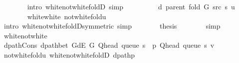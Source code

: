 \begin{isabellebody}
\ \ \ \ \ \ \isamarkupfalse%
\ {\isacharparenleft}{\kern0pt}intro\ white{\isacharunderscore}{\kern0pt}not{\isacharunderscore}{\kern0pt}white{\isacharunderscore}{\kern0pt}foldD{\isacharparenleft}{\kern0pt}{}{\isacharparenright}{\kern0pt}{\isacharparenright}{\kern0pt}\ simp\isanewline
\ \ \ \ \isamarkupfalse%
\ \isamarkupfalse%
\ {\isachardoublequoteopen}{\isachardot}{\kern0pt}{\isachardot}{\kern0pt}{\isachardot}{\kern0pt}\ {\isacharequal}{\kern0pt}\ d\ {\isacharparenleft}{\kern0pt}parent\ {\isacharparenleft}{\kern0pt}fold\ G\ src\ s{\isacharparenright}{\kern0pt}{\isacharparenright}{\kern0pt}\ u{\isachardoublequoteclose}\isanewline
\ \ \ \ \ \ \isamarkupfalse%
\ white{\isacharunderscore}{\kern0pt}white\ not{\isacharunderscore}{\kern0pt}white{\isacharunderscore}{\kern0pt}fold{\isacharunderscore}{\kern0pt}u\isanewline
\ \ \ \ \ \ \isamarkupfalse%
\ {\isacharparenleft}{\kern0pt}intro\ white{\isacharunderscore}{\kern0pt}not{\isacharunderscore}{\kern0pt}white{\isacharunderscore}{\kern0pt}foldD{\isacharparenleft}{\kern0pt}{}{\isacharparenright}{\kern0pt}{\isacharbrackleft}{\kern0pt}symmetric{\isacharbrackright}{\kern0pt}{\isacharparenright}{\kern0pt}\ simp\isanewline
\ \ \ \ \isamarkupfalse%
\ \isamarkupfalse%
\ {\isacharquery}{\kern0pt}thesis\isanewline
\ \ \ \ \ \ \isamarkupfalse%
\ simp\isanewline
\ \ \isamarkupfalse%
\isanewline
\ \ \ \ \isamarkupfalse%
\ white{\isacharunderscore}{\kern0pt}not{\isacharunderscore}{\kern0pt}white\isanewline
\ \ \ \ \isamarkupfalse%
\ dpath{\isacharunderscore}{\kern0pt}Cons{\isacharcolon}{\kern0pt}\ {\isachardoublequoteopen}dpath{\isacharunderscore}{\kern0pt}bet\ {\isacharparenleft}{\kern0pt}G{\isachardot}{\kern0pt}dE\ G{\isacharparenright}{\kern0pt}\ {\isacharparenleft}{\kern0pt}Q{\isacharunderscore}{\kern0pt}head\ {\isacharparenleft}{\kern0pt}queue\ s{\isacharparenright}{\kern0pt}\ {\isacharhash}{\kern0pt}\ p{\isacharparenright}{\kern0pt}\ {\isacharparenleft}{\kern0pt}Q{\isacharunderscore}{\kern0pt}head\ {\isacharparenleft}{\kern0pt}queue\ s{\isacharparenright}{\kern0pt}{\isacharparenright}{\kern0pt}\ v{\isachardoublequoteclose}\isanewline
\ \ \ \ \ \ \isamarkupfalse%
\ not{\isacharunderscore}{\kern0pt}white{\isacharunderscore}{\kern0pt}fold{\isacharunderscore}{\kern0pt}u\ white{\isacharunderscore}{\kern0pt}not{\isacharunderscore}{\kern0pt}white{\isacharunderscore}{\kern0pt}foldD{\isacharparenleft}{\kern0pt}{}{\isacharparenright}{\kern0pt}\ dpath{\isacharunderscore}{\kern0pt}p\isanewline

\end{isabellebody}

